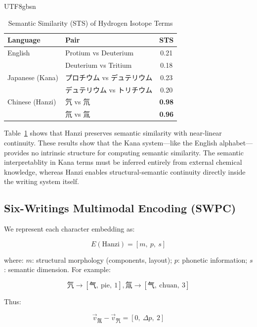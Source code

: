 \documentclass[conference]{IEEEtran}
\begin{document}
\begin{CJK*}{UTF8}{gbsn}
\begin{table}[h]
\centering
\caption{Semantic Similarity (STS) of Hydrogen Isotope Terms}
\label{tab:sts_iso}
\begin{tabular}{|l|l|c|}
\hline
\toprule
\textbf{Language} & \textbf{Pair} & \textbf{STS} \\
\midrule
\hline
English & Protium vs Deuterium & 0.21 \\
        & Deuterium vs Tritium & 0.18 \\
\midrule
\hline
Japanese (Kana) & プロチウム vs デュテリウム & 0.23 \\
                & デュテリウム vs トリチウム & 0.20 \\
\midrule
\hline
Chinese (Hanzi) & 氕 vs 氘 & \textbf{0.98} \\
                & 氘 vs 氚 & \textbf{0.96} \\
\bottomrule
\hline
\end{tabular}
\end{table}

Table~\ref{tab:sts_iso} shows that Hanzi preserves semantic similarity with near-linear continuity. These results show that the Kana system—like the English alphabet—provides no intrinsic structure for computing semantic similarity. The semantic interpretablity in Kana terms must be inferred entirely from external chemical knowledge, whereas Hanzi enables structural-semantic continuity directly inside the writing system itself.
\subsection{Six-Writings Multimodal Encoding (SWPC)}

We represent each character embedding as:

\begin{equation}
E(\text{Hanzi}) = [m,~p,~s]
\end{equation}

where: $m$: structural morphology (components, layout); $p$: phonetic information; $s$: semantic dimension. For example:

\begin{equation}
\text{氕} \rightarrow [\text{气}, \ \text{pie}, \ 1], 
\text{氚} \rightarrow [\text{气}, \ \text{chuan}, \ 3]
\end{equation}

Thus:

\begin{equation}
\vec{v}_{\text{氚}} - \vec{v}_{\text{氕}} = [0,\ \Delta p, \ 2]
\end{equation}


\end{CJK*}
\end{document}
